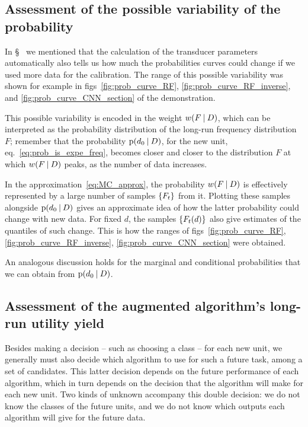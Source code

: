 \documentclass[\ifafour a4paper,12pt,\else a5paper,10pt,\fi%
onecolumn,oneside,article,%
british%
]{memoir}
\theoremstyle{remark}
\theoremstyle{innote}
\newcommand*{\wrench}{{\fontencoding{U}\fontfamily{fontawesomethree}\selectfont\symbol{114}}}
\newcommand{\mynotew}[1]{{\footnotesize\color{notecolour}\wrench\ #1}}
\DeclarePairedDelimiter\set{\{}{\}} %
\newcommand*{\p}{\mathrm{p}}%
\renewcommand*{\|}[1][]{\nonscript\:#1\vert\nonscript\:\mathopen{}}
\newcommand*{\sect}{\S}%
\newcommand*{\eqn}{eq.}%
\newcommand*{\figs}{figs}%
\newcommand*{\wf}{w}
\begin{document}
\subsection{Assessment of the possible variability of the probability}
\label{sec:variability_prob}

In \sect\mynotew{} we mentioned that the calculation of the transducer parameters automatically also tells us how much the probabilities curves could change if we used more data for the calibration. The range of this possible variability was shown for example in \figs~\ref{fig:prob_curve_RF}, \ref{fig:prob_curve_RF_inverse}, and \ref{fig:prob_curve_CNN_section} of the demonstration.

This possible variability is encoded in the weight $\wf(F \| D)$, which can be interpreted as the probability distribution of the long-run frequency distribution $F$; remember that the probability $\p(d_{0} \| D)$, for the new unit, \eqn~\eqref{eq:prob_is_expe_freq}, becomes closer and closer to the distribution $F$ at which $\wf(F \| D)$ peaks, as the number of data increases.

In the approximation~\eqref{eq:MC_approx}, the probability $\wf(F \| D)$ is effectively represented by a large number of samples $\set{F_{t}}$ from it. Plotting these samples alongside $\p(d_{0} \| D)$ gives an approximate idea of how the latter probability could change with new data. For fixed $d$, the samples $\set{F_{t}(d)}$  also give estimates of the quantiles of such change. This is how the ranges of \figs~\ref{fig:prob_curve_RF}, \ref{fig:prob_curve_RF_inverse}, \ref{fig:prob_curve_CNN_section} were obtained.

An analogous discussion holds for the marginal and conditional probabilities that we can obtain from $\p(d_{0} \| D)$.


\subsection{Assessment of the augmented algorithm's long-run utility yield}
\label{sec:algorithm_yield}

Besides making a decision -- such as choosing a class -- for each new unit, we generally must also decide which algorithm to use for such a future task, among a set of candidates. This latter decision depends on the future performance of each algorithm, which in turn depends on the decision that the algorithm will make for each new unit. Two kinds of unknown accompany this double decision: we do not know the classes of the future units, and we do not know which outputs each algorithm will give for the future data.
\end{document}
